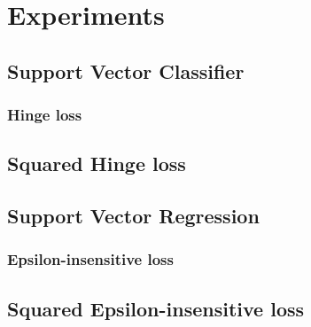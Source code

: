 \section{Experiments}


\subsection{Support Vector Classifier}


\subsubsection{Hinge loss}












\subsection{Squared Hinge loss}





\subsection{Support Vector Regression}


\subsubsection{Epsilon-insensitive loss}












\subsection{Squared Epsilon-insensitive loss}



